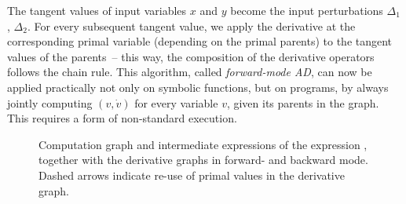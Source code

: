 The tangent values of input variables \(x\) and \(y\) become the input perturbations \(\Delta_1\),
\(\Delta_2\).  For every subsequent tangent value, we apply the derivative at the corresponding
primal variable (depending on the primal parents) to the tangent values of the parents~-- this way,
the composition of the derivative operators follows the chain rule.  This algorithm, called
\emph{forward-mode AD}, can now be applied practically not only on symbolic functions, but on
programs, by always jointly computing \((v, \dot{v})\) for every variable \(v\), given its parents
in the graph.  This requires a form of non-standard execution.

\begin{figure}[t]
  \centering
  \qquad
  \caption{Computation graph and intermediate expressions of the expression \protect{}, together with the derivative graphs in forward- and backward mode.  Dashed arrows
    indicate re-use of primal values in the derivative graph.}
  \label{fig:comp-graph-2}
\end{figure}

